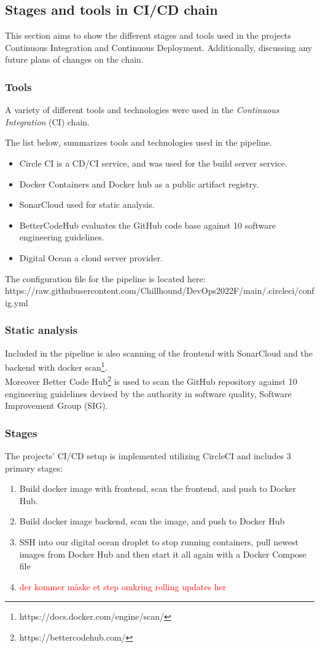 \subsection{Stages and tools in CI/CD chain}
This section aims to show the different stages and tools used in the projects Continuous Integration and Continuous Deployment. Additionally, discussing any future plans of changes on the chain.

\subsubsection{Tools}
A variety of different tools and technologies were used in the \textit{Continuous Integration} (CI) chain. 

The list below, summarizes tools and technologies used in the pipeline. 
\begin{itemize}
    \item Circle CI is a CD/CI service, and was used for the build server service.
    \item Docker Containers and Docker hub as a public artifact registry.
    \item SonarCloud used for static analysis.
    \item BetterCodeHub evaluates the GitHub code base against 10 software engineering guidelines.
    \item Digital Ocean a cloud server provider.
\end{itemize}

The configuration file for the pipeline is located here: https://raw.githubusercontent.com/Chillhound/DevOps2022F/main/.circleci/config.yml

\subsubsection*{Static analysis}
Included in the pipeline is also scanning of the frontend with SonarCloud and the backend with docker scan\footnote{https://docs.docker.com/engine/scan/}. \\
Moreover Better Code Hub\footnote{https://bettercodehub.com/} is used to scan the GitHub repository against 10 engineering guidelines devised by the authority in software quality, Software Improvement Group (SIG). 

\subsubsection{Stages}
The projects' CI/CD setup is implemented utilizing CircleCI and includes 3 primary stages: 
\begin{enumerate}
    \item Build docker image with frontend, scan the frontend, and push to Docker Hub.
    \item Build docker image backend, scan the image, and push to Docker Hub
    \item SSH into our digital ocean droplet to stop running containers, pull newest images from Docker Hub and then start it all again with a Docker Compose file
    \item \textcolor{red}{der kommer måske et step omkring rolling updates her}
\end{enumerate}

